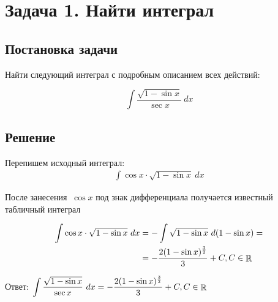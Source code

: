 \def \task {
	\int \frac{\sqrt{1 - \sin{x}}}{ \sec{x} } ~ dx
}

\section{Задача 1. Найти интеграл}
\subsection{Постановка задачи}
Найти следующий интеграл с подробным описанием всех действий:

\[\task \]

\subsection{Решение}

Перепишем исходный интеграл:
\begin{align*}
	\int \cos{x} \cdot \sqrt{1 - \sin{x}} ~ dx
\end{align*}

После занесения $\ \cos{x} $ под знак дифференциала получается известный табличный интеграл

\begin{align*}
	\int  \cos{x} \cdot \sqrt{1 - \sin{x}} ~ dx
	& = -\int \sqrt{1 - \sin{x}} ~ d(1 - \sin{x}) = \\
	& = -\frac{2 (1 - \sin{x})^\frac{3}{2}}{3} + {C},
	C \in \mathop{\rm \mathbb{R}}
\end{align*}

Ответ: $ \displaystyle \task = -\frac{2 (1 - \sin{x})^\frac{3}{2}}{3} + {C}, C \in \rational $
